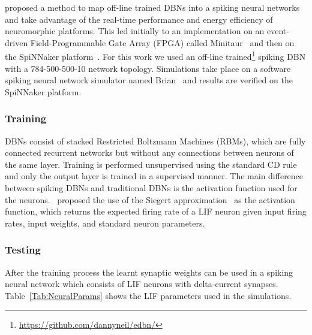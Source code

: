 \citet{o2013real} proposed a method to map off-line trained DBNs into a spiking neural networks and take advantage of the real-time performance and energy efficiency of neuromorphic platforms. This led initially to an implementation on an event-driven Field-Programmable Gate Array (FPGA) called Minitaur~\citep{neil2014minitaur} and then on the SpiNNaker platform~\citep{Stromatias2015scalable}. For this work we used an off-line trained\footnote{\url{https://github.com/dannyneil/edbn/}} spiking DBN with a 784-500-500-10 network topology. Simulations take place on a software spiking neural network simulator named Brian~\citep{goodman2008brian} and results are verified on the SpiNNaker platform.

\subsubsection{Training}

DBNs consist of stacked Restricted Boltzmann Machines (RBMs), which are fully connected recurrent networks but without any connections between neurons of the same layer. Training is performed unsupervised using the standard CD rule~\citep{hinton2006fast} and only the output layer is trained in a supervised manner. The main difference between spiking DBNs and traditional DBNs is the activation function used for the neurons.~\cite{o2013real} proposed the use of the Siegert approximation~\citep{Jug_etal_2012} as the activation function, which returns the expected firing rate of a LIF neuron given input firing rates, input weights, and standard neuron parameters.

\subsubsection{Testing}
After the training process the learnt synaptic weights can be used in a spiking neural network which consists of LIF neurons with delta-current synapses. Table~\ref{Tab:NeuralParams} shows the LIF parameters used in the simulations.

